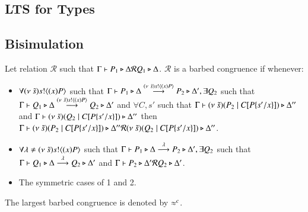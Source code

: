 \subsection{LTS for Types}



\subsection{Bisimulation}

\begin{definition}\rm
	Let relation $\mathcal{R}$ such that $\Gamma \vdash P_1 \triangleright \Delta \mathcal{R} Q_1 \triangleright \Delta$.
	$\mathcal{R}$ is a barbed congruence if whenever:
	\begin{itemize}
		\item	$\forall (\nu\ \tilde{s}) s ! \langle (x)P \rangle$ such that $\Gamma \vdash P_1 \triangleright \Delta \stackrel{(\nu\ \tilde{s}) s ! \langle (x)P \rangle}{\longrightarrow} P_2 \triangleright \Delta', \exists
			Q_2$ such that $\Gamma \vdash Q_1 \triangleright \Delta \stackrel{(\nu\ \tilde{s}) s ! \langle (x)P \rangle}{\longrightarrow} Q_2 \triangleright \Delta'$ and
			$\forall C, s'$ such that $\Gamma \vdash (\nu\ \tilde{s})(P_2 \;|\; C[P \{s'/x \}]) \triangleright \Delta''$ and
			$\Gamma \vdash (\nu\ \tilde{s})(Q_2 \;|\; C[P \{s'/x \}]) \triangleright \Delta''$ then
			$\Gamma \vdash (\nu\ \tilde{s})(P_2 \;|\; C[P \{s'/x \}]) \triangleright \Delta'' \mathcal{R} (\nu\ \tilde{s})(Q_2 \;|\; C[P \{s'/x \}]) \triangleright \Delta''$.

		\item	$\forall \lambda \not= (\nu\ \tilde{s}) s ! \langle (x)P \rangle$ such that $\Gamma \vdash P_1 \triangleright \Delta \stackrel{\lambda}{\longrightarrow} P_2 \triangleright \Delta', \exists
			Q_2$ such that $\Gamma \vdash Q_1 \triangleright \Delta \stackrel{\lambda}{\longrightarrow} Q_2 \triangleright \Delta'$ and
			$\Gamma \vdash P_2 \triangleright \Delta' \mathcal{R} Q_2 \triangleright \Delta'$.

		\item	The symmetric cases of 1 and 2.
	\end{itemize}
	The largest barbed congruence is denoted by $\approx^c$.
\end{definition}


